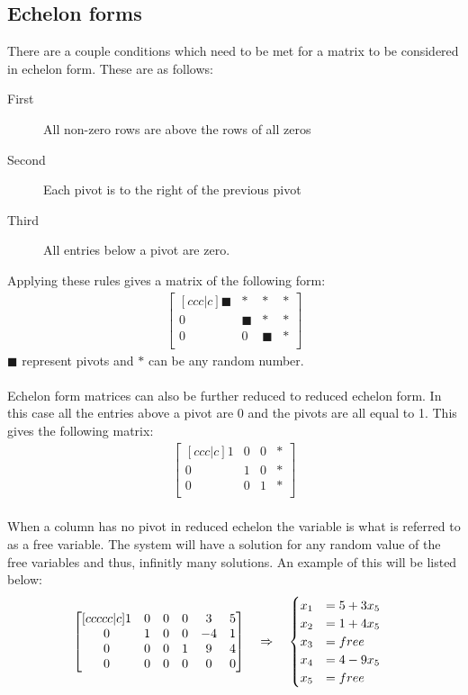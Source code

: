 \documentclass[11pt, a4paper]{article}
\begin{document}
\subsection{Echelon forms}
There are a couple conditions which need to be met for a matrix to be considered in echelon form. These are
as follows:
\begin{description}
    \item[First] All non-zero rows are above the rows of all zeros
    \item[Second] Each pivot is to the right of the previous pivot
    \item[Third] All entries below a pivot are zero.  
\end{description}
Applying these rules gives a matrix of the following form:
\begin{align*}
    \begin{bmatrix}[ccc|c]
        \blacksquare & * & * & *\\
        0 & \blacksquare & * & *\\
        0 & 0 & \blacksquare & *\\
    \end{bmatrix}
\end{align*}
$\blacksquare$ represent pivots and $*$ can be any random number.\\
\\
Echelon form matrices can also be further reduced to reduced echelon form. In this
case all the entries above a pivot are 0 and the pivots are all equal to 1. This gives
the following matrix:
\begin{align*}
    \begin{bmatrix}[ccc|c]
        1 & 0 & 0 & *\\
        0 & 1 & 0 & *\\
        0 & 0 & 1 & *\\
    \end{bmatrix}
\end{align*}
\\
When a column has no pivot in reduced echelon the variable is what is referred to as a free variable.
The system will have a solution for any random value of the free variables and thus, infinitly many solutions.
An example of this will be listed below:
\begin{align*}
    \begin{bmatrix}[ccccc|c]
        1 & 0 & 0 & 0 & 3 & 5\\
        0 & 1 & 0 & 0 & -4 & 1\\
        0 & 0 & 0 & 1 & 9 & 4\\
        0 & 0 & 0 & 0 & 0 & 0 \\
    \end{bmatrix} 
    \hspace{-1em}
    \qquad &\Rightarrow \quad
    \begin{cases} 
        x_1 &= 5 + 3x_5 \\
        x_2 &= 1 + 4x_5\\
        x_3 &= free\\
        x_4 &= 4 - 9x_5\\
        x_5 &= free\\
       \end{cases}     
\end{align*}
\end{document}
